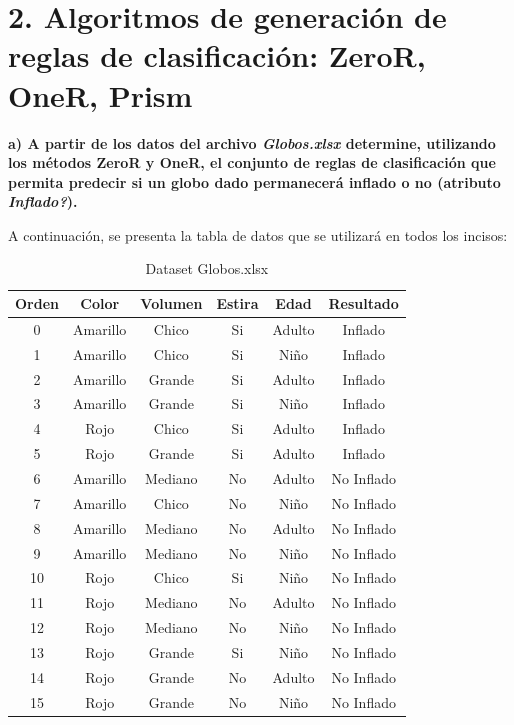 \documentclass{article}
\begin{document}

\section*{2. Algoritmos de generación de reglas de clasificación: ZeroR, OneR, Prism}

\textbf{a) A partir de los datos del archivo \textit{Globos.xlsx} determine, utilizando los métodos \textbf{ZeroR y} \textbf{OneR,} el conjunto de reglas de clasificación que permita predecir si un globo dado permanecerá inflado o no (atributo \textit{Inflado?}).}

\vspace{0.5cm}

A continuación, se presenta la tabla de datos que se utilizará en todos los incisos:

\begin{table}[H]
    \centering
    \renewcommand{\arraystretch}{1.2}
    \begin{tabular}{|c|c|c|c|c|c|}
        \hline
        \textbf{Orden} & \textbf{Color} & \textbf{Volumen} & \textbf{Estira} & \textbf{Edad} & \textbf{Resultado} \\ \hline
        0 & Amarillo & Chico & Si & Adulto & Inflado \\ \hline
        1 & Amarillo & Chico & Si & Niño & Inflado \\ \hline
        2 & Amarillo & Grande & Si & Adulto & Inflado \\ \hline
        3 & Amarillo & Grande & Si & Niño & Inflado \\ \hline
        4 & Rojo & Chico & Si & Adulto & Inflado \\ \hline
        5 & Rojo & Grande & Si & Adulto & Inflado \\ \hline
        6 & Amarillo & Mediano & No & Adulto & No Inflado \\ \hline
        7 & Amarillo & Chico & No & Niño & No Inflado \\ \hline
        8 & Amarillo & Mediano & No & Adulto & No Inflado \\ \hline
        9 & Amarillo & Mediano & No & Niño & No Inflado \\ \hline
        10 & Rojo & Chico & Si & Niño & No Inflado \\ \hline
        11 & Rojo & Mediano & No & Adulto & No Inflado \\ \hline
        12 & Rojo & Mediano & No & Niño & No Inflado \\ \hline
        13 & Rojo & Grande & Si & Niño & No Inflado \\ \hline
        14 & Rojo & Grande & No & Adulto & No Inflado \\ \hline
        15 & Rojo & Grande & No & Niño & No Inflado \\ \hline
    \end{tabular}
    \caption{Dataset Globos.xlsx}
\end{table}
\end{document}
